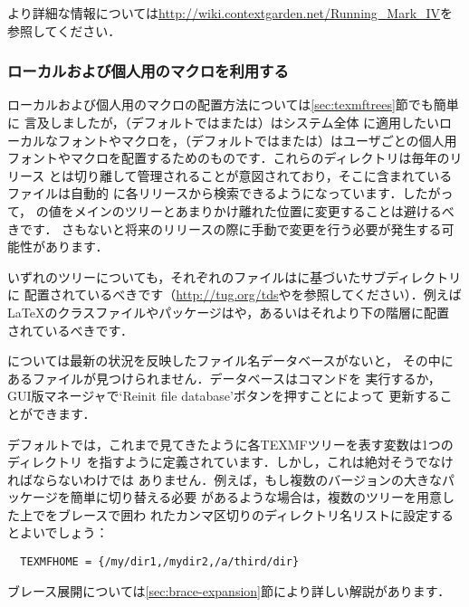 \documentclass[uplatex,dvipdfmx]{jsarticle}
\begin{document}
より詳細な情報については\url{http://wiki.contextgarden.net/Running_Mark_IV}を
参照してください．

\subsubsection{ローカルおよび個人用のマクロを利用する}
\label{sec:local-personal-macros}

ローカルおよび個人用のマクロの配置方法については\ref{sec:texmftrees}節でも簡単に
言及しましたが，（デフォルトではまたは）はシステム全体
に適用したいローカルなフォントやマクロを，（デフォルトではまたは）はユーザごとの個人用
フォントやマクロを配置するためのものです．これらのディレクトリは毎年のリリース
とは切り離して管理されることが意図されており，そこに含まれているファイルは自動的
に各\TL リリースから検索できるようになっています．したがって，%
の値をメインの\TL ツリーとあまりかけ離れた位置に変更することは避けるべきです．
さもないと将来のリリースの際に手動で変更を行う必要が発生する可能性があります．

いずれのツリーについても，それぞれのファイルは\TDS に基づいたサブディレクトリに
配置されているべきです（\url{http://tug.org/tds}やを参照してください）．例えば\LaTeX のクラスファイルやパッケージはや，あるいはそれより下の階層に配置
されているべきです．

については最新の状況を反映したファイル名データベースがないと，
その中にあるファイルが見つけられません．データベースはコマンドを
実行するか，GUI版\TL マネージャで`Reinit file database'ボタンを押すことによって
更新することができます．

デフォルトでは，これまで見てきたように各TEXMFツリーを表す変数は1つのディレクトリ
を指すように定義されています．しかし，これは絶対そうでなければならないわけでは
ありません．例えば，もし複数のバージョンの大きなパッケージを簡単に切り替える必要
があるような場合は，複数のツリーを用意した上でをブレースで囲わ
れたカンマ区切りのディレクトリ名リストに設定するとよいでしょう：
%
\begin{verbatim}
  TEXMFHOME = {/my/dir1,/mydir2,/a/third/dir}
\end{verbatim}
%
ブレース展開については\ref{sec:brace-expansion}節により詳しい解説があります．
\end{document}
